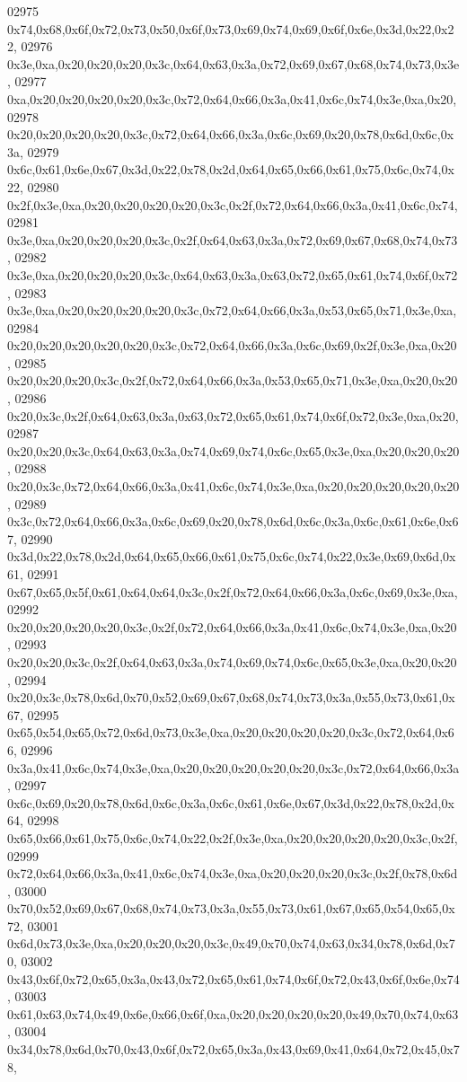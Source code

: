 \begin{DoxyCode}
02975   0x74,0x68,0x6f,0x72,0x73,0x50,0x6f,0x73,0x69,0x74,0x69,0x6f,0x6e,0x3d,0x22,0x22,
02976   0x3e,0xa,0x20,0x20,0x20,0x3c,0x64,0x63,0x3a,0x72,0x69,0x67,0x68,0x74,0x73,0x3e,
02977   0xa,0x20,0x20,0x20,0x20,0x3c,0x72,0x64,0x66,0x3a,0x41,0x6c,0x74,0x3e,0xa,0x20,
02978   0x20,0x20,0x20,0x20,0x3c,0x72,0x64,0x66,0x3a,0x6c,0x69,0x20,0x78,0x6d,0x6c,0x3a,
02979   0x6c,0x61,0x6e,0x67,0x3d,0x22,0x78,0x2d,0x64,0x65,0x66,0x61,0x75,0x6c,0x74,0x22,
02980   0x2f,0x3e,0xa,0x20,0x20,0x20,0x20,0x3c,0x2f,0x72,0x64,0x66,0x3a,0x41,0x6c,0x74,
02981   0x3e,0xa,0x20,0x20,0x20,0x3c,0x2f,0x64,0x63,0x3a,0x72,0x69,0x67,0x68,0x74,0x73,
02982   0x3e,0xa,0x20,0x20,0x20,0x3c,0x64,0x63,0x3a,0x63,0x72,0x65,0x61,0x74,0x6f,0x72,
02983   0x3e,0xa,0x20,0x20,0x20,0x20,0x3c,0x72,0x64,0x66,0x3a,0x53,0x65,0x71,0x3e,0xa,
02984   0x20,0x20,0x20,0x20,0x20,0x3c,0x72,0x64,0x66,0x3a,0x6c,0x69,0x2f,0x3e,0xa,0x20,
02985   0x20,0x20,0x20,0x3c,0x2f,0x72,0x64,0x66,0x3a,0x53,0x65,0x71,0x3e,0xa,0x20,0x20,
02986   0x20,0x3c,0x2f,0x64,0x63,0x3a,0x63,0x72,0x65,0x61,0x74,0x6f,0x72,0x3e,0xa,0x20,
02987   0x20,0x20,0x3c,0x64,0x63,0x3a,0x74,0x69,0x74,0x6c,0x65,0x3e,0xa,0x20,0x20,0x20,
02988   0x20,0x3c,0x72,0x64,0x66,0x3a,0x41,0x6c,0x74,0x3e,0xa,0x20,0x20,0x20,0x20,0x20,
02989   0x3c,0x72,0x64,0x66,0x3a,0x6c,0x69,0x20,0x78,0x6d,0x6c,0x3a,0x6c,0x61,0x6e,0x67,
02990   0x3d,0x22,0x78,0x2d,0x64,0x65,0x66,0x61,0x75,0x6c,0x74,0x22,0x3e,0x69,0x6d,0x61,
02991   0x67,0x65,0x5f,0x61,0x64,0x64,0x3c,0x2f,0x72,0x64,0x66,0x3a,0x6c,0x69,0x3e,0xa,
02992   0x20,0x20,0x20,0x20,0x3c,0x2f,0x72,0x64,0x66,0x3a,0x41,0x6c,0x74,0x3e,0xa,0x20,
02993   0x20,0x20,0x3c,0x2f,0x64,0x63,0x3a,0x74,0x69,0x74,0x6c,0x65,0x3e,0xa,0x20,0x20,
02994   0x20,0x3c,0x78,0x6d,0x70,0x52,0x69,0x67,0x68,0x74,0x73,0x3a,0x55,0x73,0x61,0x67,
02995   0x65,0x54,0x65,0x72,0x6d,0x73,0x3e,0xa,0x20,0x20,0x20,0x20,0x3c,0x72,0x64,0x66,
02996   0x3a,0x41,0x6c,0x74,0x3e,0xa,0x20,0x20,0x20,0x20,0x20,0x3c,0x72,0x64,0x66,0x3a,
02997   0x6c,0x69,0x20,0x78,0x6d,0x6c,0x3a,0x6c,0x61,0x6e,0x67,0x3d,0x22,0x78,0x2d,0x64,
02998   0x65,0x66,0x61,0x75,0x6c,0x74,0x22,0x2f,0x3e,0xa,0x20,0x20,0x20,0x20,0x3c,0x2f,
02999   0x72,0x64,0x66,0x3a,0x41,0x6c,0x74,0x3e,0xa,0x20,0x20,0x20,0x3c,0x2f,0x78,0x6d,
03000   0x70,0x52,0x69,0x67,0x68,0x74,0x73,0x3a,0x55,0x73,0x61,0x67,0x65,0x54,0x65,0x72,
03001   0x6d,0x73,0x3e,0xa,0x20,0x20,0x20,0x3c,0x49,0x70,0x74,0x63,0x34,0x78,0x6d,0x70,
03002   0x43,0x6f,0x72,0x65,0x3a,0x43,0x72,0x65,0x61,0x74,0x6f,0x72,0x43,0x6f,0x6e,0x74,
03003   0x61,0x63,0x74,0x49,0x6e,0x66,0x6f,0xa,0x20,0x20,0x20,0x20,0x49,0x70,0x74,0x63,
03004   0x34,0x78,0x6d,0x70,0x43,0x6f,0x72,0x65,0x3a,0x43,0x69,0x41,0x64,0x72,0x45,0x78,

\end{DoxyCode}
